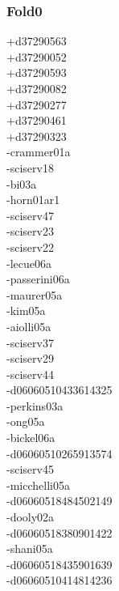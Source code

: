 \begin{multicols}{4}
\subsubsection*{Fold0}
+d37290563\\
+d37290052\\
+d37290593\\
+d37290082\\
+d37290277\\
+d37290461\\
+d37290323\\
-crammer01a\\
-sciserv18\\
-bi03a\\
-horn01ar1\\
-sciserv47\\
-sciserv23\\
-sciserv22\\
-lecue06a\\
-passerini06a\\
-maurer05a\\
-kim05a\\
-aiolli05a\\
-sciserv37\\
-sciserv29\\
-sciserv44\\
-d06060510433614325\\
-perkins03a\\
-ong05a\\
-bickel06a\\
-d06060510265913574\\
-sciserv45\\
-micchelli05a\\
-d06060518484502149\\
-dooly02a\\
-d06060518380901422\\
-shani05a\\
-d06060518435901639\\
-d06060510414814236\\

\end{multicols}
